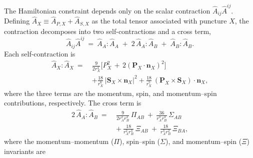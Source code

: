 \documentclass[
  aps,
  prd,
  twocolumn,
  amsmath,
  amssymb,
  nofootinbib,
  superscriptaddress,
  floatfix,
]{revtex4-2}
\newcommand{\Ahat}{\hat{A}}
\begin{document}
The Hamiltonian constraint depends only on the scalar contraction
$\Ahat_{ij}\Ahat^{ij}$. Defining
$\Ahat_X \equiv \Ahat_{P,X}+\Ahat_{S,X}$ as the total tensor associated with
puncture $X$, the contraction decomposes into two self-contractions and a cross
term,
\begin{equation}
  \Ahat_{ij}\Ahat^{ij} \ = \ \Ahat_A\!:\!\Ahat_A \;+\; 2\,\Ahat_A\!:\!\Ahat_B \; + \; \Ahat_B\!:\!\Ahat_B .
  \label{eq:A2_full}
\end{equation}
Each self-contraction is
\begin{equation}
\begin{aligned}
  \Ahat_X\!:\!\Ahat_X \ = \ &
  \frac{9}{2r_X^4}\bigl[P_X^2 \, + \, 2(\mathbf{P}_X\!\cdot\!\mathbf{n}_X)^2\bigr] \\
  &+ \frac{18}{r_X^6}\,|\mathbf{S}_X\!\times\!\mathbf{n}_X|^2
   + \frac{18}{r_X^5}\,(\mathbf{P}_X\!\times\!\mathbf{S}_X)\!\cdot\!\mathbf{n}_X ,
\end{aligned}
  \label{eq:A2_self}
\end{equation}
where the three terms are the momentum, spin, and momentum--spin contributions,
respectively. The cross term is
\begin{equation}
\begin{aligned}
  2\,\Ahat_A\!:\!\Ahat_B \ = \ &
  \frac{9}{2r_A^2 r_B^2}\,\Pi_{AB}
  \ + \ \frac{36}{r_A^3 r_B^3}\,\Sigma_{AB} \\
  &+ \ \frac{18}{r_A^2 r_B^3}\,\Xi_{AB}
  \ + \ \frac{18}{r_A^3 r_B^2}\,\Xi_{BA} ,
\end{aligned}
  \label{eq:A2_cross}
\end{equation}
where the momentum--momentum ($\Pi$), spin--spin ($\Sigma$), and
momentum--spin ($\Xi$) invariants are
\end{document}

